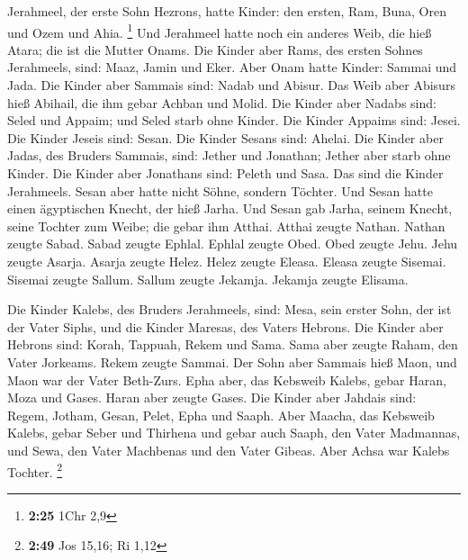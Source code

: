  Jerahmeel, der erste Sohn Hezrons, hatte Kinder: den
ersten, Ram, Buna, Oren und Ozem und Ahia. \footnote{\textbf{2:25} 1Chr
  2,9}  Und Jerahmeel hatte noch ein anderes Weib, die
hieß Atara; die ist die Mutter Onams.  Die Kinder aber
Rams, des ersten Sohnes Jerahmeels, sind: Maaz, Jamin und Eker.
 Aber Onam hatte Kinder: Sammai und Jada. Die Kinder aber
Sammais sind: Nadab und Abisur.  Das Weib aber Abisurs
hieß Abihail, die ihm gebar Achban und Molid.  Die Kinder
aber Nadabs sind: Seled und Appaim; und Seled starb ohne Kinder.
 Die Kinder Appaims sind: Jesei. Die Kinder Jeseis sind:
Sesan. Die Kinder Sesans sind: Ahelai.  Die Kinder aber
Jadas, des Bruders Sammais, sind: Jether und Jonathan; Jether aber starb
ohne Kinder.  Die Kinder aber Jonathans sind: Peleth und
Sasa. Das sind die Kinder Jerahmeels.  Sesan aber hatte
nicht Söhne, sondern Töchter. Und Sesan hatte einen ägyptischen Knecht,
der hieß Jarha.  Und Sesan gab Jarha, seinem Knecht,
seine Tochter zum Weibe; die gebar ihm Atthai.  Atthai
zeugte Nathan. Nathan zeugte Sabad.  Sabad zeugte Ephlal.
Ephlal zeugte Obed.  Obed zeugte Jehu. Jehu zeugte
Asarja.  Asarja zeugte Helez. Helez zeugte Eleasa.
 Eleasa zeugte Sisemai. Sisemai zeugte Sallum.
 Sallum zeugte Jekamja. Jekamja zeugte Elisama.

 Die Kinder Kalebs, des Bruders Jerahmeels, sind: Mesa,
sein erster Sohn, der ist der Vater Siphs, und die Kinder Maresas, des
Vaters Hebrons.  Die Kinder aber Hebrons sind: Korah,
Tappuah, Rekem und Sama.  Sama aber zeugte Raham, den
Vater Jorkeams. Rekem zeugte Sammai.  Der Sohn aber
Sammais hieß Maon, und Maon war der Vater Beth-Zurs. 
Epha aber, das Kebsweib Kalebs, gebar Haran, Moza und Gases. Haran aber
zeugte Gases.  Die Kinder aber Jahdais sind: Regem,
Jotham, Gesan, Pelet, Epha und Saaph.  Aber Maacha, das
Kebsweib Kalebs, gebar Seber und Thirhena  und gebar auch
Saaph, den Vater Madmannas, und Sewa, den Vater Machbenas und den Vater
Gibeas. Aber Achsa war Kalebs Tochter. \footnote{\textbf{2:49} Jos
  15,16; Ri 1,12}

